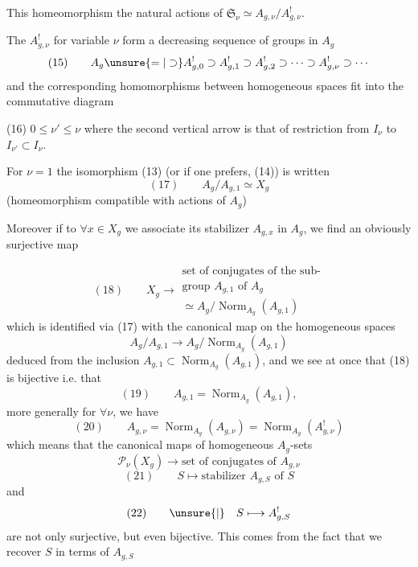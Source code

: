 This homeomorphism  the natural
actions of $\mathfrak S_\nu\simeq A_{g,\nu}/A_{g,\nu}^!$.

The $A_{g,\nu}^!$ for variable $\nu$ form a
decreasing sequence of groups in $A_g$
\[
(15)\qquad A_g\unsure{=|\supset}A_{g,0}^!\supset A_{g,1}^!\supset A_{g,2}^!
\supset\cdots\supset A_{g,\nu}^!\supset\cdots
\]
and the corresponding homomorphisms
between homogeneous spaces  fit into the
commutative diagram  

(16)\quad
{}
\quad $0\leq\nu'\leq\nu$
where the second vertical arrow is that of
restriction from $I_\nu$ to $I_{\nu'}\subset I_\nu$.

For $\nu=1$  the isomorphism (13) (or if one prefers,
(14)) is written
\[
(17)\qquad A_g/A_{g,1}\simeq X_g
\]
(homeomorphism compatible with  actions of $A_g$)

Moreover if to $\forall x\in X_g$ we associate its
stabilizer $A_{g,x}$ in $A_g$, we find an
obviously surjective map

\[
(18)\qquad X_g\longrightarrow
\begin{gathered}
\text{set of conjugates of the sub-}\\
\text{group }A_{g,1}\text{ of }A_g\\
\simeq A_g/\operatorname{Norm}_{A_g}(A_{g,1})
\end{gathered}
\]
which is identified via (17) with the canonical map
on the homogeneous spaces
\[
 A_g/A_{g,1}\longrightarrow A_g/\operatorname{Norm}_{A_g}(A_{g,1})
\]
deduced from the inclusion $A_{g,1}\subset\operatorname{Norm}_{A_g}(A_{g,1})$,
and we see at once that (18) is
bijective i.e. that 
\[
(19)\qquad A_{g,1}=\operatorname{Norm}_{A_g}(A_{g,1}),
\]
more generally for $\forall\nu$, we have
\[
(20)\qquad A_{g,\nu}=\operatorname{Norm}_{A_g}(A_{g,\nu})
=\operatorname{Norm}_{A_g}(A_{g,\nu}^!)
\]
which means that the canonical maps
of homogeneous $A_g$-sets
\[
\mathcal P_\nu(X_g)\longrightarrow\text{set of conjugates of }A_{g,\nu}
\]
\[
(21)\qquad S\longmapsto\text{stabilizer }A_{g,S}\text{ of }S
\]
and
\[
(22)\qquad\unsure{\vert}\quad S\longmapsto A_{g,S}^!
\]
are not only surjective, but even bijective.
This comes from the fact that we recover
$S$ in terms of $A_{g,S}$\deleted{${}^!$} 
  

